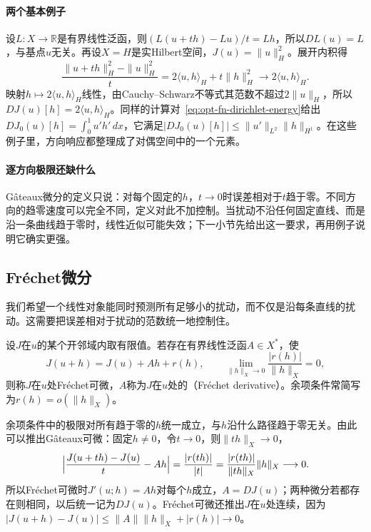 \paragraph{两个基本例子}
设$L:X\to\mathbb R$是有界线性泛函，则$(L(u+th)-Lu)/t=Lh$，所以$DL(u)=L$，与基点$u$无关。再设$X=H$是实Hilbert空间，$J(u)=\|u\|_H^2$。展开内积得
\[
 \frac{\|u+th\|_H^2-\|u\|_H^2}{t}=2\langle u,h\rangle_H+t\|h\|_H^2\longrightarrow2\langle u,h\rangle_H .
\]
映射$h\mapsto2\langle u,h\rangle_H$线性，由Cauchy--Schwarz不等式其范数不超过$2\|u\|_H$，所以$DJ(u)[h]=2\langle u,h\rangle_H$。同样的计算对~\eqref{eq:opt-fn-dirichlet-energy}给出$DJ_0(u)[h]=\int_0^1u'h'\,dx$，它满足$|DJ_0(u)[h]|\le\|u'\|_{L^2}\|h\|_{H^1}$。在这些例子里，方向响应都整理成了对偶空间中的一个元素。

\paragraph{逐方向极限还缺什么}
Gâteaux微分的定义只说：对每个固定的$h$，$t\to0$时误差相对于$t$趋于零。不同方向的趋零速度可以完全不同，定义对此不加控制。当扰动不沿任何固定直线、而是沿一条曲线趋于零时，线性近似可能失效；下一小节先给出这一要求，再用例子说明它确实更强。

\subsection{Fréchet微分}
\label{sec:opt-fn-frechet}

我们希望一个线性对象能同时预测所有足够小的扰动，而不仅是沿每条直线的扰动。这需要把误差相对于扰动的范数统一地控制住。

\begin{definition}[Fréchet微分]
\label{def:opt-fn-frechet}
设$J$在$u$的某个开邻域内取有限值。若存在有界线性泛函$A\in X^*$，使
\begin{equation}
 J(u+h)=J(u)+Ah+r(h),\qquad\lim_{\|h\|_X\to0}\frac{|r(h)|}{\|h\|_X}=0 ,
 \label{eq:opt-fn-frechet}
\end{equation}
则称$J$在$u$处Fréchet可微，$A$称为$J$在$u$处的（Fréchet derivative）。余项条件常简写为$r(h)=o(\|h\|_X)$。
\end{definition}

余项条件中的极限对所有趋于零的$h$统一成立，与$h$沿什么路径趋于零无关。由此可以推出Gâteaux可微：固定$h\neq0$，令$t\to0$，则$\|th\|_X\to0$，
\[
 \Bigl|\frac{J(u+th)-J(u)}{t}-Ah\Bigr|=\frac{|r(th)|}{|t|}=\frac{|r(th)|}{\|th\|_X}\|h\|_X\longrightarrow0 .
\]
所以Fréchet可微时$J'(u;h)=Ah$对每个$h$成立，$A=DJ(u)$；两种微分若都存在则相同，以后统一记为$DJ(u)$。Fréchet可微还推出$J$在$u$处连续，因为$|J(u+h)-J(u)|\le\|A\|\|h\|_X+|r(h)|\to0$。

